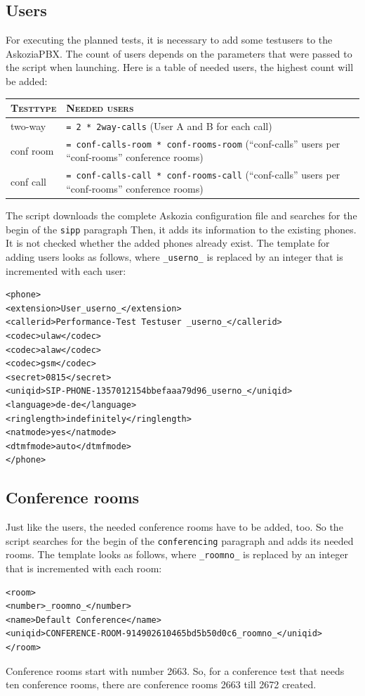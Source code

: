 \subsection{Users}
For executing the planned tests, it is necessary to add some testusers to the AskoziaPBX.
The count of users depends on the parameters that were passed to the script when launching.
Here is a table of needed users, the highest count will be added:

\begin{tabular}{|p{2cm}|p{13cm}|} \hline
	\textsc{Testtype} & \textsc{Needed users} \\ \hline \hline
	two-way & \texttt{= 2 * 2way-calls} (User A and B for each call) \\
	conf room & \texttt{= conf-calls-room * conf-rooms-room} \newline (``conf-calls'' users per ``conf-rooms'' conference rooms) \\
	conf call & \texttt{= conf-calls-call * conf-rooms-call} \newline (``conf-calls'' users per ``conf-rooms'' conference rooms) \\
	\hline
\end{tabular}

The script downloads the complete Askozia configuration file and searches for the begin of the \texttt{sipp} paragraph
Then, it adds its information to the existing phones. It is not checked whether the added phones already exist.
The template for adding users looks as follows, where \texttt{\_userno\_} is replaced by an integer that is incremented with each user:
\begin{lstlisting}[breaklines=true,label=code:config-user-template,caption={User template} ]
<phone>
<extension>User_userno_</extension>
<callerid>Performance-Test Testuser _userno_</callerid>
<codec>ulaw</codec>
<codec>alaw</codec>
<codec>gsm</codec>
<secret>0815</secret>
<uniqid>SIP-PHONE-1357012154bbefaaa79d96_userno_</uniqid>
<language>de-de</language>
<ringlength>indefinitely</ringlength>
<natmode>yes</natmode>
<dtmfmode>auto</dtmfmode>
</phone>
\end{lstlisting}

\subsection{Conference rooms}
Just like the users, the needed conference rooms have to be added, too. So the script searches for the begin of the \texttt{conferencing}
paragraph and adds its needed rooms. The template looks as follows, where \texttt{\_roomno\_} is replaced by an integer that is incremented with each room:
\begin{lstlisting}[breaklines=true,label=code:config-room-template,caption={Conference room template} ]
<room>
<number>_roomno_</number>
<name>Default Conference</name>
<uniqid>CONFERENCE-ROOM-914902610465bd5b50d0c6_roomno_</uniqid>
</room>
\end{lstlisting}

Conference rooms start with number 2663. So, for a conference test that needs ten conference rooms, there are conference rooms 2663 till 2672 created.
